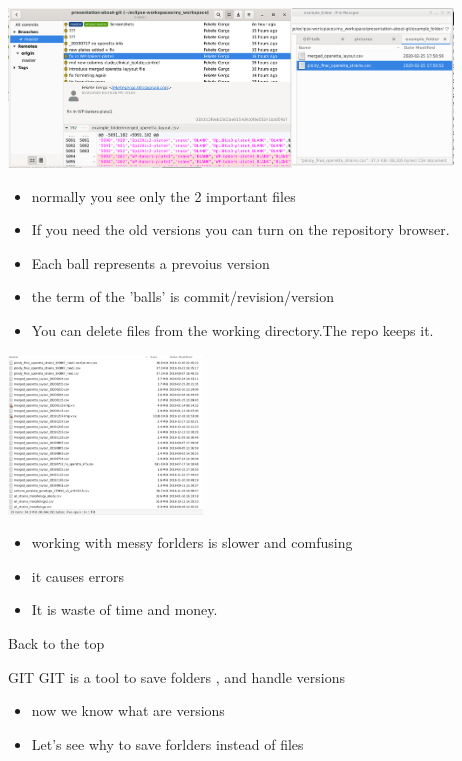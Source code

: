 \documentclass[aspectratio=169]{beamer}
\begin{document}
\begin{frame}
\includegraphics[height=120pt]{pictures/Screenshot_2020-02-26_10-21-26-folder_in_git.png}

\begin{itemize}
	\item normally you see only the 2 important files 
	\item If you need the old versions you can turn on the repository browser.
	\pause
	\item Each ball represents a prevoius version
	\item the term of the 'balls' is commit/revision/version
	\pause
	\item You can delete files from the working directory.The repo keeps it.
\end{itemize}
\end{frame}

\begin{frame}
\includegraphics[height=120pt]{pictures/Screenshot_2020-02-25_17-47-03-ugly_folder.png}

\begin{itemize}
		\item working with messy forlders is slower and comfusing
		\item it causes errors
		\item It is waste of time and money.
	\end{itemize}

\end{frame}


\begin{frame}

  Back to the top
  
	\begin{block}{GIT}
		GIT is a  tool to save folders , and handle versions
	\end{block}
  
	\begin{itemize}
  		\item now we know what are versions
		\item Let's see why to save forlders instead of files
	\end{itemize}

\end{frame}
\end{document}
